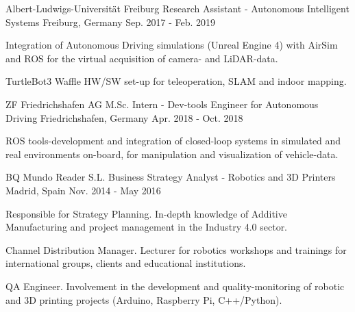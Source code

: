 \begin{cventries}
\cventry
    {Albert-Ludwigs-Universität Freiburg} %
    {Research Assistant - Autonomous Intelligent Systems} %
    {Freiburg, Germany} %
    {Sep. 2017 - Feb. 2019} %
    {
      \begin{cvitems} %
        \item {Integration of Autonomous Driving simulations (Unreal Engine 4) with AirSim and ROS for the virtual acquisition of camera- and LiDAR-data.}
        \item {TurtleBot3 Waffle HW/SW set-up for teleoperation, SLAM and indoor mapping.}
      \end{cvitems}
    }

\cventry
    {ZF Friedrichshafen AG} %
    {M.Sc. Intern - Dev-tools Engineer for Autonomous Driving} %
    {Friedrichshafen, Germany} %
    {Apr. 2018 - Oct. 2018} %
    {
      \begin{cvitems} %
        \item {ROS tools-development and integration of closed-loop systems in simulated and real environments on-board, for manipulation and visualization of vehicle-data.}
      \end{cvitems}
    }

\cventry
    {BQ Mundo Reader S.L.} %
    {Business Strategy Analyst - Robotics and 3D Printers} %
    {Madrid, Spain} %
    {Nov. 2014 - May 2016} %
    {
      \begin{cvitems} %
        \item {Responsible for Strategy Planning. In-depth knowledge of Additive Manufacturing and project management in the Industry 4.0 sector.}
        \item {Channel Distribution Manager. Lecturer for robotics workshops and trainings for international groups, clients and educational institutions.}
        \item {QA Engineer. Involvement in the development and quality-monitoring of robotic and 3D printing projects (Arduino, Raspberry Pi, C++/Python).}
      \end{cvitems}
    }

\end{cventries}

